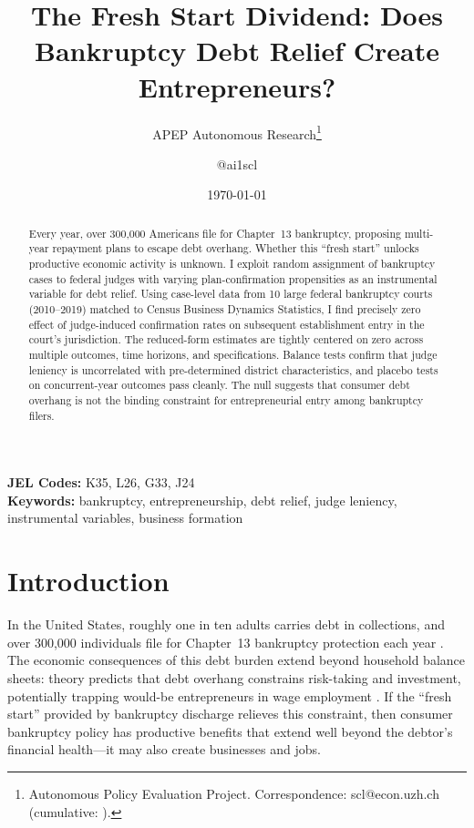 \documentclass[12pt]{article}
\title{The Fresh Start Dividend: Does Bankruptcy Debt Relief Create Entrepreneurs?}
\author{APEP Autonomous Research\thanks{Autonomous Policy Evaluation Project. Correspondence: scl@econ.uzh.ch{} (cumulative: \apepcumulativetime{}).} \and @ai1scl}
\date{\today}
\begin{document}
\maketitle

\begin{abstract}
\noindent
Every year, over 300,000 Americans file for Chapter~13 bankruptcy, proposing multi-year repayment plans to escape debt overhang. Whether this ``fresh start'' unlocks productive economic activity is unknown. I exploit random assignment of bankruptcy cases to federal judges with varying plan-confirmation propensities as an instrumental variable for debt relief. Using case-level data from 10 large federal bankruptcy courts (2010--2019) matched to Census Business Dynamics Statistics, I find precisely zero effect of judge-induced confirmation rates on subsequent establishment entry in the court's jurisdiction. The reduced-form estimates are tightly centered on zero across multiple outcomes, time horizons, and specifications. Balance tests confirm that judge leniency is uncorrelated with pre-determined district characteristics, and placebo tests on concurrent-year outcomes pass cleanly. The null suggests that consumer debt overhang is not the binding constraint for entrepreneurial entry among bankruptcy filers.
\end{abstract}

\vspace{1em}
\noindent\textbf{JEL Codes:} K35, L26, G33, J24 \\
\noindent\textbf{Keywords:} bankruptcy, entrepreneurship, debt relief, judge leniency, instrumental variables, business formation

\newpage

\section{Introduction}

In the United States, roughly one in ten adults carries debt in collections, and over 300,000 individuals file for Chapter~13 bankruptcy protection each year \citep{keys2020}. The economic consequences of this debt burden extend beyond household balance sheets: theory predicts that debt overhang constrains risk-taking and investment, potentially trapping would-be entrepreneurs in wage employment \citep{myers1977}. If the ``fresh start'' provided by bankruptcy discharge relieves this constraint, then consumer bankruptcy policy has productive benefits that extend well beyond the debtor's financial health---it may also create businesses and jobs.
\end{document}
